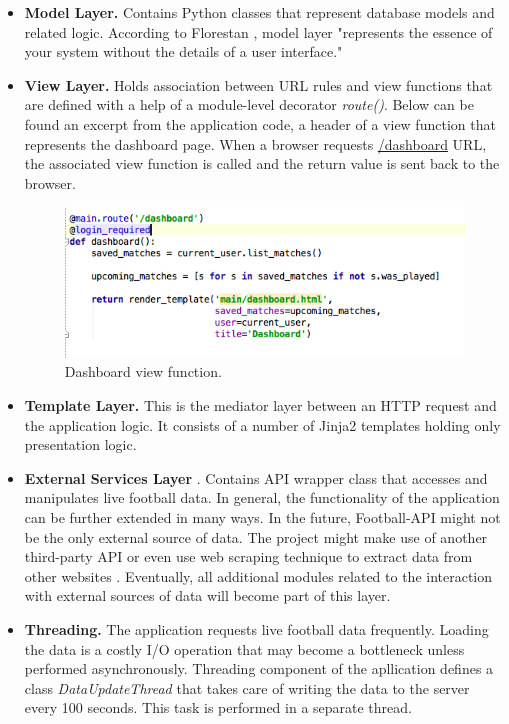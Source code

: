 \begin{itemize}
    \item \textbf{Model Layer.} Contains Python classes that represent database models and related logic. According to Florestan \citet{article:goodArchitecture}, model layer "represents the essence of your system without the details of a user interface."
    \item \textbf{View Layer.} Holds association between URL rules and view functions that are defined with a help of a module-level decorator \emph{route()}. Below can be found an excerpt from the application code, a header of a view function that represents the dashboard page. When a browser requests \url{/dashboard} URL, the associated view function is called and the return value is sent back to the browser. 

\begin{figure}[H]
    \begin{center}
        \includegraphics[width=.70\textwidth]{impl/images/routeExample}
        \caption{Dashboard view function.} \label{fig:using:routeexample}
    \end{center}
\end{figure}     
        
    \item \textbf{Template Layer.} This is the mediator layer between an HTTP request and the application logic. It consists of a number of Jinja2 templates holding only     presentation logic. 
    \item \textbf{External Services Layer} \citet{article:goodArchitecture}. Contains API wrapper class that accesses and manipulates live football data. In general, the functionality of the application can be further extended in many ways. In the future, Football-API might not be the only external source of data. The project might make use of another third-party API or even use web scraping technique to extract data from other websites . Eventually, all additional modules related to the interaction with external sources of data will become part of this layer.
    \item \textbf{Threading.} The application requests live football data frequently. Loading the data is a costly I/O operation that may become a bottleneck unless performed asynchronously. Threading component of the apllication defines a class \emph{DataUpdateThread} that takes care of writing the data to the server every 100 seconds. This task is performed in a separate thread. 
\end{itemize}

